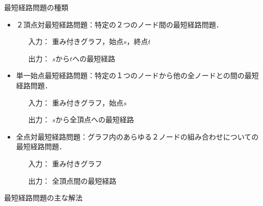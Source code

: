 \documentclass[12pt]{optlab-bachelor}
\begin{document}
\begin{description}
  \item[最短経路問題の種類]
\end{description}
\begin{itemize}
\item ２頂点対最短経路問題：特定の２つのノード間の最短経路問題．
\begin{itemize}
  \item[入力：]重み付きグラフ，始点$s$，終点$t$
  \item[出力：]$s$から$t$への最短経路
\end{itemize}
\item 単一始点最短経路問題：特定の１つのノードから他の全ノードとの間の最短経路問題．
\begin{itemize}
  \item[入力：]重み付きグラフ，始点$s$
  \item[出力：]$s$から全頂点への最短経路
\end{itemize}
\item 全点対最短経路問題：グラフ内のあらゆる２ノードの組み合わせについての最短経路問題．
\begin{itemize}
  \item[入力：]重み付きグラフ
  \item[出力：]全頂点間の最短経路
\end{itemize}
\end{itemize}
\begin{description}
  \item[最短経路問題の主な解法]
\end{description}
\end{document}
